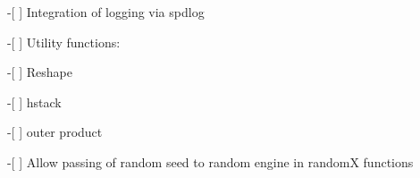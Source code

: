 -\/\mbox{[} \mbox{]} Integration of logging via spdlog

-\/\mbox{[} \mbox{]} Utility functions\+: \begin{DoxyVerb}-[ ] Reshape

-[ ] hstack

-[ ] outer product

-[ ] Allow passing of random seed to random engine in randomX functions
\end{DoxyVerb}
 